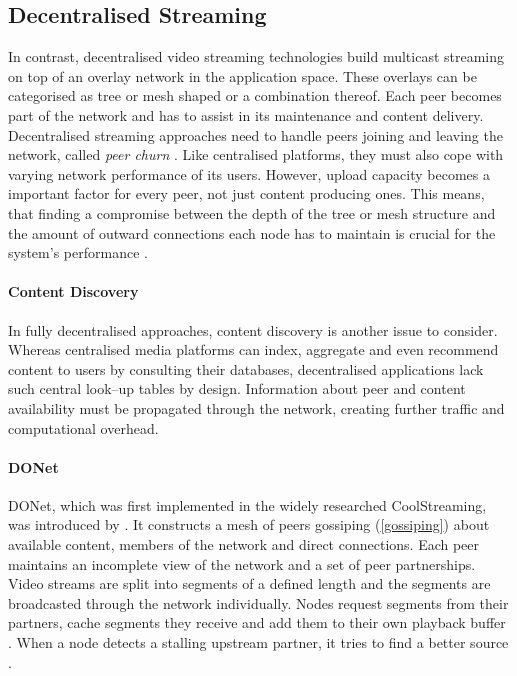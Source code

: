 \subsection{Decentralised Streaming}

In contrast, decentralised video streaming technologies build multicast streaming on top of an overlay network in the application space. These overlays can be categorised as tree or mesh shaped or a combination thereof. Each peer becomes part of the network and has to assist in its maintenance and content delivery. Decentralised streaming approaches need to handle peers joining and leaving the network, called \textit{peer churn} \cite[\S7.5]{tanenbaum_wetherall_2011}. Like centralised platforms, they must also cope with varying network performance of its users. However, upload capacity becomes a important factor for every peer, not just content producing ones. This means, that finding a compromise between the depth of the tree or mesh structure and the amount of outward connections each node has to maintain is crucial for the system's performance \cite[\S{III.A}]{multicast-problems}.

\paragraph{Content Discovery}
In fully decentralised approaches, content discovery is another issue to consider. Whereas centralised media platforms can index, aggregate and even recommend content to users by consulting their databases, decentralised applications lack such central look–up tables by design. Information about peer and content availability must be propagated through the network, creating further traffic and computational overhead.

\paragraph{DONet}
DONet, which was first implemented in the widely researched CoolStreaming, was introduced by \citet{coolstreaming}. It constructs a mesh of peers gossiping (\ref{gossiping}) about available content, members of the network and direct connections. Each peer maintains an incomplete view of the network and a set of peer partnerships. Video streams are split into segments of a defined length and the segments are broadcasted through the network individually. Nodes request segments from their partners, cache segments they receive and add them to their own playback buffer \cite[\S{III.B}]{coolstreaming}. When a node detects a stalling upstream partner, it tries to find a better source \cite[\S{IV.A}]{coolstreaming-design-theory}.


